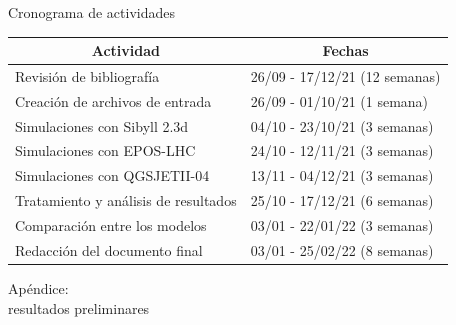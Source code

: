 \documentclass[10pt,xcolor=table]{beamer}
\begin{document}
\begin{frame}{Cronograma de actividades}
	\begin{table}[]
		\begin{tabular}{@{}ll@{}}
		\toprule
		\multicolumn{1}{c}{\textbf{Actividad}}                      & \multicolumn{1}{c}{\textbf{Fechas}} \\ \midrule
		\multicolumn{1}{l}{Revisi\'on de bibliograf\'ia}           & 26/09 - 17/12/21 (12 semanas)    \\ \midrule
		\multicolumn{1}{l}{Creaci\'on de archivos de entrada}      & 26/09 - 01/10/21 (1 semana)      \\ \midrule
		\multicolumn{1}{l}{Simulaciones con Sibyll 2.3d}           & 04/10 - 23/10/21 (3 semanas)     \\ \midrule
		\multicolumn{1}{l}{Simulaciones con EPOS-LHC}              & 24/10 - 12/11/21 (3 semanas)     \\ \midrule
		\multicolumn{1}{l}{Simulaciones con QGSJETII-04}           & 13/11 - 04/12/21 (3 semanas)     \\ \midrule
		\multicolumn{1}{l}{Tratamiento y an\'alisis de resultados} & 25/10 - 17/12/21 (6 semanas)     \\ \midrule
		\multicolumn{1}{l}{Comparaci\'on entre los modelos}        & 03/01 - 22/01/22 (3 semanas)     \\ \midrule
		\multicolumn{1}{l}{Redacci\'on del documento final}        & 03/01 - 25/02/22 (8 semanas)     \\ \bottomrule
		\end{tabular}
	\end{table}
\end{frame}

\begin{frame}[noframenumbering]
	\begin{Huge}
	Ap\'endice: \\
	
	resultados preliminares
	\end{Huge}
\end{frame}
\end{document}
